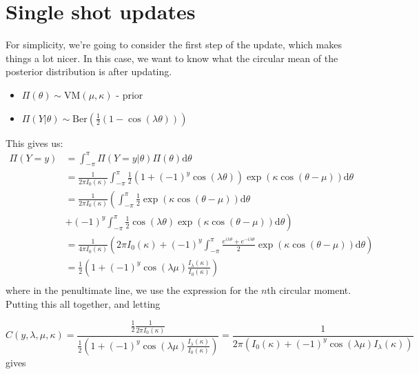 \documentclass[]{report}
\begin{document}
\section{Single shot updates}
For simplicity, we're going to consider the first step of the update, which makes things a lot nicer. In this case, we want to know what the circular mean of the posterior distribution is after updating.

\begin{itemize}
	\item $\Pi(\theta) \sim \text{VM}(\mu, \kappa)$ - prior
	\item $\Pi(Y | \theta) \sim \text{Ber}(\frac{1}{2}(1 - \cos(\lambda \theta)))$
\end{itemize}

This gives us:
\begin{align*}
	\Pi(Y = y) &= \int_{-\pi}^{\pi} \Pi(Y = y | \theta) \Pi\left( \theta \right) \text{d}\theta \\
		   &= \frac{1}{2 \pi I_0(\kappa)} \int_{- \pi}^{\pi} \frac{1}{2} (1 + (-1)^y \cos(\lambda \theta)) \exp(\kappa \cos(\theta - \mu)) \text{d} \theta \\
	&= \frac{1}{2 \pi I_0(\kappa)} \left( \int_{- \pi}^{\pi} \frac{1}{2} \exp(\kappa \cos(\theta - \mu)) \text{d} \theta \right. \\
	 &\left. + (-1)^y \int_{- \pi}^{\pi} \frac{1}{2} \cos(\lambda \theta) \exp(\kappa \cos(\theta - \mu)) \text{d} \theta  \right) \\
	 &= \frac{1}{4 \pi I_0\left( \kappa \right) }\left( 2\pi I_0\left( \kappa \right)  + (-1)^{y} \int_{-\pi}^{\pi}\frac{e^{i \lambda \theta} + e^{-i \lambda \theta}}{2}\exp\left( \kappa \cos \left( \theta - \mu \right)  \right) \text{d}\theta \right) \\
	&= \frac{1}{2}\left(1 + (-1)^y \cos(\lambda \mu) \frac{I_\lambda(\kappa)}{I_0(\kappa)}\right)  \\
\end{align*}
where in the penultimate line, we use the expression for the $n$th circular moment.
Putting this all together, and letting

\[
C(y, \lambda, \mu, \kappa) = \frac{\frac{1}{2} \frac{1}{2 \pi I_0(\kappa)}}{\frac{1}{2} (1 + (-1)^y \cos(\lambda \mu) \frac{I_\lambda(\kappa)}{I_0(\kappa)} )} = \frac{1}{ 2 \pi(I_0(\kappa) + (-1)^y \cos(\lambda \mu) I_\lambda(\kappa))}
\]
gives
\end{document}
